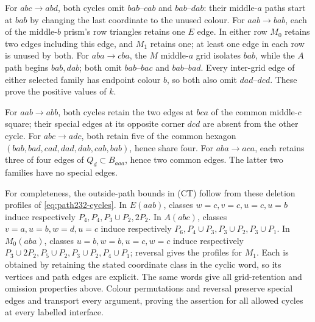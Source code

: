 For $abc\to abd$, both cycles omit $bab$--$cab$ and $bab$--$dab$:
their middle-$a$ paths start at $bab$ by changing the last coordinate
to the unused colour. For $aab\to bab$, each of the middle-$b$
prism's row triangles retains one $E$ edge. In either row $M_0$
retains two edges including this edge, and $M_1$ retains one; at
least one edge in each row is unused by both. For $aba\to cba$,
the $M$ middle-$a$ grid isolates $bab$, while the $A$ path begins
$bab,dab$; both omit $bab$--$bac$ and $bab$--$bad$. Every inter-grid
edge of either selected family has endpoint colour $b$, so both
also omit $dad$--$dcd$. These prove the positive values of $k$.

For $aab\to abb$, both cycles retain the two edges at $bca$ of the
common middle-$c$ square; their special edges at its opposite corner
$dcd$ are absent from the other cycle. For $abc\to adc$, both retain
five of the common hexagon
$(bab,bad,cad,dad,dab,cab,bab)$, hence share four. For $aba\to aca$,
each retains three of four edges of $Q_d\subset B_{aaa}$, hence
two common edges. The latter two families have no special edges.

For completeness, the outside-path bounds in (CT) follow from these
deletion profiles of \eqref{eq:path232-cycles}. In $E(aab)$, classes
$w=c,v=c,u=c,u=b$ induce respectively $P_4,P_4,P_3\cup P_2,2P_2$.
In $A(abc)$, classes $v=a,u=b,w=d,u=c$ induce respectively
$P_6,P_4\cup P_3,P_3\cup P_2,P_3\cup P_1$.
In $M_0(aba)$, classes $u=b,w=b,u=c,w=c$ induce respectively
$P_3\cup2P_2,P_5\cup P_2,P_3\cup P_2,P_4\cup P_1$;
reversal gives the profiles for $M_1$. Each is obtained by retaining
the stated coordinate class in the cyclic word, so its vertices and
path edges are explicit. The same words give all grid-retention and
omission properties above. Colour permutations and reversal preserve
special edges and transport every argument, proving the assertion
for all allowed cycles at every labelled interface.

